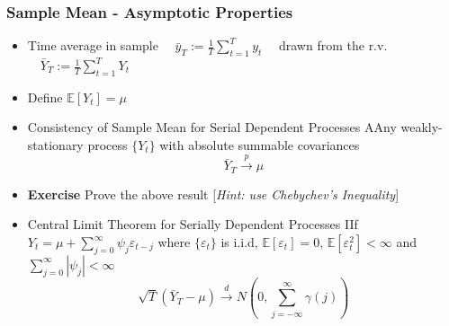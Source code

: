 \documentclass{beamer}
\begin{document}
	\begin{frame}
	\frametitle{Sample Mean - Asymptotic Properties}
	\begin{itemize}

\item[] Time average in sample  $\quad \bar{y}_T:=\frac{1}{T}\sum_{t=1}^T y_t\quad$ drawn from the r.v. $\quad \bar{Y}_T:=\frac{1}{T}\sum_{t=1}^T Y_t$ 
	\vspace{2pt}
\pause 

\item[] Define $\mathbb{E}[Y_t]=\mu$ 
			\vspace{5pt}
			\pause 
			
					\item[] \begin{mytheo}{Consistency of Sample Mean for Serial Dependent Processes}
			AAny weakly-stationary process $\{Y_t\}$ with absolute summable covariances
			\begin{equation*}
	\bar{Y}_T\overset{p}{\rightarrow} \mu
			\end{equation*}%
		 \end{mytheo}
	 
	 \item[] \textbf{Exercise} Prove the above result [\textit{Hint: use Chebychev's Inequality}]
			
				\vspace{5pt}
			\pause 
			
			
				\item[] \begin{mytheo}{Central Limit Theorem for Serially Dependent Processes}
				IIf $Y_t=\mu+\sum_{j=0}^{\infty} \psi_j \varepsilon_{t-j}$ where $\{\varepsilon_t\}$ is  i.i.d, $\mathbb{E}[\varepsilon_t]=0$, $\mathbb{E}[\varepsilon_t^2]<\infty$ and $\sum_{j=0}^{\infty} |\psi_j|<\infty$
				\begin{equation*}
				\sqrt{T}(\bar{Y}_T-\mu)\overset{d}{\rightarrow} N\left(0, \sum_{j=-\infty}^{\infty} \gamma(j)\right)
				\end{equation*}%
			\end{mytheo}
			
			
		\end{itemize}
	\end{frame}
\end{document}
